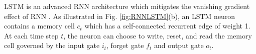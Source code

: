 \documentclass[letterpaper]{article}
\begin{document}
LSTM is an advanced RNN architecture which mitigates the vanishing gradient effect of RNN \cite{LSTM1997,vanish2001,Graves2012}. As illustrated in Fig. \ref{fig:RNNLSTM}(b), an LSTM neuron contains a memory cell ${c}_t$ which has a self-connected recurrent edge of weight 1. At each time step $t$, the neuron can choose to write, reset, and read the memory cell governed by the input gate ${i}_t$, forget gate ${f}_t$ and output gate ${o}_t$.
\begin{comment}
Their activations of LSTM neurons can be summarized as follows:
\begin{eqnarray}
	\begin{aligned}
		\label{equ:LSTM}
		\mathbf{i}_t & =  \sigma( \mathsfsl{W}_{xi}\mathbf{x}_t  +  \mathsfsl{W}_{hi}\mathbf{h}_{t-1} + \mathbf{w}_{ci}\odot \mathbf{c}_{t-1} + \mathbf{b}_i),  \\
		\mathbf{f}_t & =  \sigma(\mathsfsl{W}_{xf}\mathbf{x}_t   +  \mathsfsl{W}_{hf}\mathbf{h}_{t-1}+ \mathbf{w}_{cf}\odot \mathbf{c}_{t-1} + \mathbf{b}_f), \\
		\mathbf{c}_t & = \mathbf{f}_t \!\odot \!\mathbf{c}_{t-1} + \mathbf{i}_t \!\odot\!\tanh(\mathsfsl{W}_{xc}\mathbf{x}_t \! + \!\mathsfsl{W}_{hc}\mathbf{h}_{t-1} \!+ \!\mathbf{b}_c), \\
		\mathbf{o}_t & =  \sigma( \mathsfsl{W}_{xo}\mathbf{x}_t  +  \mathsfsl{W}_{ho}\mathbf{h}_{t-1}  + \mathsfsl{w}_{co}\odot \mathbf{c}_t + \mathbf{b}_o), \\
	    \mathbf{h}_t & =  \mathbf{o}_t\odot \tanh(\mathbf{c}_t),
	\end{aligned}
\end{eqnarray}
where $\odot$ is the element-wise product, $\sigma(\cdot)$ is the sigmoid activation function, $\mathsfsl{W}_{u v}$ denotes the weighting matrix between $u$ and $v$ , $u  \in \{x,h\}$, $v \in \{ i,f,c,o \}$.
\end{comment}
\end{document}
